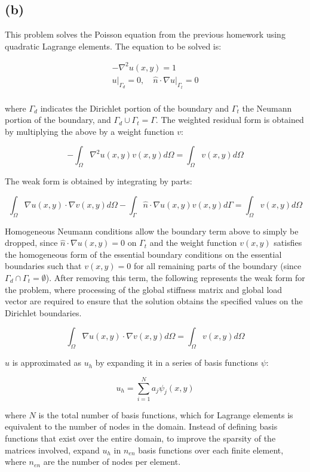 \documentclass[10pt]{article}
\newcommand{\beq}{\begin{equation}}
\newcommand{\eeq}{\end{equation}}
\newcommand{\beqa}{\begin{equation}\begin{aligned}}
\newcommand{\eeqa}{\end{aligned}\end{equation}}
\begin{document}
\subsection{(b)}

This problem solves the Poisson equation from the previous homework using quadratic Lagrange elements. The equation to be solved is:

\beqa
-\nabla^2u(x,y)=1\\
u\rvert_{\Gamma_d}=0,\quad \hat{n}\cdot\nabla u\rvert_{\Gamma_t}=0\\
\eeqa

where \(\Gamma_d\) indicates the Dirichlet portion of the boundary and \(\Gamma_t\) the Neumann portion of the boundary, and \(\Gamma_d\cup\Gamma_t=\Gamma\). The weighted residual form is obtained by multiplying the above by a weight function \(v\):

\beq
-\int_\Omega \nabla^2u(x,y)v(x,y)d\Omega=\int_\Omega v(x,y)d\Omega
\eeq

The weak form is obtained by integrating by parts:

\beq
\int_\Omega \nabla u(x,y)\cdot\nabla v(x,y)d\Omega-\int_\Gamma\hat{n}\cdot\nabla u(x,y)v(x,y)d\Gamma=\int_\Omega v(x,y)d\Omega
\eeq

Homogeneous Neumann conditions allow the boundary term above to simply be dropped, since \(\hat{n}\cdot\nabla u(x,y)=0\) on \(\Gamma_t\) and the weight function \(v(x,y)\) satisfies the homogeneous form of the essential boundary conditions on the essential boundaries such that \(v(x,y)=0\) for all remaining parts of the boundary (since \(\Gamma_d\cap\Gamma_t=\emptyset\)). After removing this term, the following represents the weak form for the problem, where processing of the global stiffness matrix and global load vector are required to ensure that the solution obtains the specified values on the Dirichlet boundaries.

\beq
\int_\Omega \nabla u(x,y)\cdot\nabla v(x,y)d\Omega=\int_\Omega v(x,y)d\Omega
\eeq

\(u\) is approximated as \(u_h\) by expanding it in a series of basis functions \(\psi\):

\beq
u_h=\sum_{i=1}^{N}a_j\psi_j(x,y)
\eeq

where \(N\) is the total number of basis functions, which for Lagrange elements is equivalent to the number of nodes in the domain. Instead of defining basis functions that exist over the entire domain, to improve the sparsity of the matrices involved, expand \(u_h\) in \(n_{en}\) basis functions over each finite element, where \(n_{en}\) are the number of nodes per element. 
\end{document}
